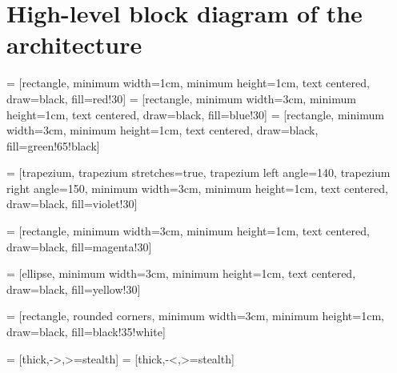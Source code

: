 \documentclass[12pt]{article}
\begin{document}
\section{High-level block diagram of the architecture}

 = [rectangle, 
minimum width=1cm, 
minimum height=1cm,
text centered, 
draw=black, 
fill=red!30]
 = [rectangle, 
minimum width=3cm, 
minimum height=1cm,
text centered, 
draw=black, 
fill=blue!30]
 = [rectangle, 
minimum width=3cm, 
minimum height=1cm,
text centered, 
draw=black, 
fill=green!65!black]

 = [trapezium, 
trapezium stretches=true, %
trapezium left angle=140, 
trapezium right angle=150, 
minimum width=3cm, 
minimum height=1cm, text centered, 
draw=black, fill=violet!30]

 = [rectangle,  
minimum width=3cm, 
minimum height=1cm,
text centered, 
draw=black, 
fill=magenta!30]

 = [ellipse,  
minimum width=3cm, 
minimum height=1cm,
text centered, 
draw=black, 
fill=yellow!30]

 = [rectangle, rounded corners,
minimum width=3cm, 
minimum height=1cm,
draw=black, 
fill=black!35!white]

 = [thick,->,>=stealth]
 = [thick,-<,>=stealth]
\end{document}
